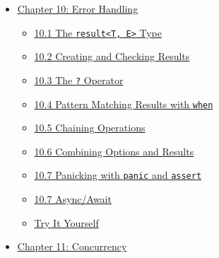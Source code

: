 \documentclass[
  english,
]{book}
\providecommand{\tightlist}{%
  \setlength{\itemsep}{0pt}\setlength{\parskip}{0pt}}
\begin{document}
\begin{itemize}
  \begin{itemize}
  \tightlist
  \item
    \hyperref[91-string-literals-and-escapes]{9.1 String Literals and
    Escapes}
  \item
    \hyperref[92-f-strings-string-interpolation]{9.2 F-Strings (String
    Interpolation)}
  \item
    \hyperref[93-built-in-string-functions]{9.3 Built-in String
    Functions}
  \item
    \hyperref[94-string-building-patterns]{9.4 String Building Patterns}
  \item
    \hyperref[95-working-with-split-and-join]{9.5 Working with Split and
    Join}
  \item
    \hyperref[96-string-searching]{9.6 String Searching}
  \item
    \hyperref[97-regular-expressions]{9.7 Regular Expressions}
  \item
    \hyperref[98-date-and-time]{9.8 Date and Time}
  \item
    \hyperref[99-hexadecimal-literals]{9.9 Hexadecimal Literals}
  \item
    \hyperref[try-it-yourself]{Try It Yourself}
  \end{itemize}
\item
  \hyperref[chapter-10-error-handling]{Chapter 10: Error Handling}

  \begin{itemize}
  \tightlist
  \item
    \hyperref[101-the-resultt-e-type]{10.1 The
    \texttt{result\textless{}T,\ E\textgreater{}} Type}
  \item
    \hyperref[102-creating-and-checking-results]{10.2 Creating and
    Checking Results}
  \item
    \hyperref[103-the--operator]{10.3 The \texttt{?} Operator}
  \item
    \hyperref[104-pattern-matching-results-with-when]{10.4 Pattern
    Matching Results with \texttt{when}}
  \item
    \hyperref[105-chaining-operations]{10.5 Chaining Operations}
  \item
    \hyperref[106-combining-options-and-results]{10.6 Combining Options
    and Results}
  \item
    \hyperref[107-panicking-with-panic-and-assert]{10.7 Panicking with
    \texttt{panic} and \texttt{assert}}
  \item
    \hyperref[107-asyncawait]{10.7 Async/Await}
  \item
    \hyperref[try-it-yourself]{Try It Yourself}
  \end{itemize}
\item
  \hyperref[chapter-11-concurrency]{Chapter 11: Concurrency}


\end{itemize}
\end{document}
